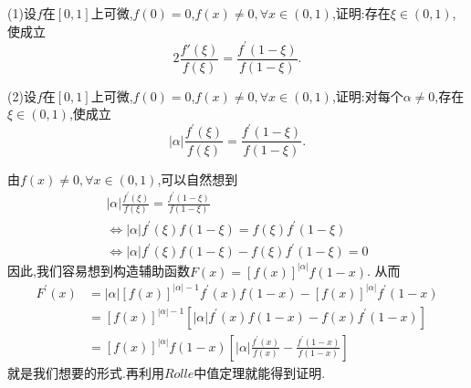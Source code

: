 \documentclass[lang=cn,newtx,10pt,scheme=chinese]{elegantbook}
\begin{document}
\begin{exercise}
    (1)设\(f\)在\([0,1]\)上可微,\(f(0)=0\),\(f(x)\neq0,\forall x\in(0,1)\),证明:存在\(\xi\in(0,1)\),使成立
    \begin{equation}
        2\frac{f'(\xi)}{f(\xi)}=\frac{f^{\prime}(1-\xi)}{f(1-\xi)}.
        \nonumber
    \end{equation}

(2)设\(f\)在\([0,1]\)上可微,\(f(0)=0\),\(f(x)\neq0,\forall x\in(0,1)\),证明:对每个\(\alpha\neq0\),存在\(\xi\in(0,1)\),使成立
\begin{equation}
        \vert\alpha\vert\frac{f^{\prime}(\xi)}{f(\xi)}=\frac{f^{\prime}(1-\xi)}{f(1-\xi)}.
        \nonumber
    \end{equation}
\end{exercise}
\begin{note}
    由$f(x)\ne0,\forall x\in(0,1)$,可以自然想到
    \begin{gather}
            \left| \alpha \right|\frac{f^{\prime}(\xi )}{f(\xi )}=\frac{f^{\prime}(1-\xi )}{f(1-\xi )}
            \nonumber
            \\ \nonumber
\Leftrightarrow \left| \alpha \right|f^{\prime}(\xi )f(1-\xi )=f(\xi )f^{\prime}(1-\xi )
\\\nonumber
\Leftrightarrow \left| \alpha \right|f^{\prime}(\xi )f(1-\xi )-f(\xi )f^{\prime}(1-\xi )=0
    \end{gather}
    因此,我们容易想到构造辅助函数$F\left( x \right) =\left[ f\left( x \right) \right] ^{\left| \alpha \right|}f\left( 1-x \right)$.
    从而
    \begin{equation}
        \begin{split}
            F^{\prime}\left( x \right) &=\left| \alpha \right|\left[ f\left( x \right) \right] ^{\left| \alpha \right|-1}f^{\prime}(x)f(1-x)-\left[ f\left( x \right) \right] ^{\left| \alpha \right|}f^{\prime}(1-x)
\\
&=\left[ f\left( x \right) \right] ^{\left| \alpha \right|-1}\left[ \left| \alpha \right|f^{\prime}(x)f(1-x)-f(x)f^{\prime}(1-x) \right]
\\
&=\left[ f\left( x \right) \right] ^{\left| \alpha \right|}f(1-x)\left[ \left| \alpha \right|\frac{f^{\prime}(x)}{f(x)}-\frac{f^{\prime}(1-x)}{f(1-x)} \right]        
\end{split}
        \nonumber
    \end{equation}
    就是我们想要的形式.再利用$Rolle$中值定理就能得到证明.
\end{note}
\end{document}

